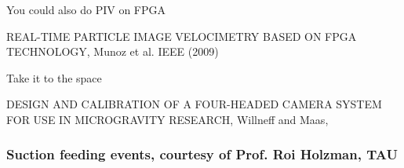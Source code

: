     
%    
%    
    \begin{frame}[label=app-110]{You could also do PIV on FPGA}
    \begin{cardTiny}
    REAL-TIME PARTICLE IMAGE VELOCIMETRY
    BASED ON FPGA TECHNOLOGY, Munoz et al. IEEE (2009)
    \end{cardTiny}
    \end{frame}
%    
%    
\begin{frame}[label=app-111]{Take it to the space}
    \begin{cardTiny}
    DESIGN AND CALIBRATION OF A FOUR-HEADED CAMERA SYSTEM
    FOR USE IN MICROGRAVITY RESEARCH, Willneff and Maas, 
    \end{cardTiny}
\end{frame}
    

\begin{frame}[label=app-1]
    \frametitle{Suction feeding events, courtesy of Prof. Roi Holzman, TAU}
\end{frame}
    

